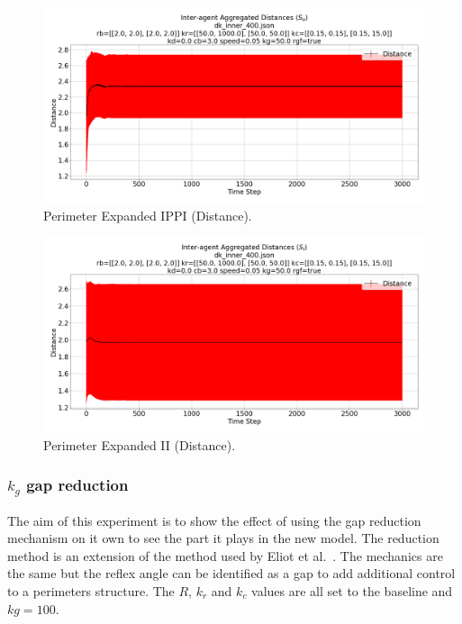 \documentclass[12pt,a4paper]{IEEEtran}
\newcommand{\kc}{\mathit{k_{c}}}
\newcommand{\kr}{\mathit{k_{r}}}
\newcommand{\kg}{\mathit{k_{g}}}
\newcommand{\rb}{\mathit{R}}
\begin{document}
\begin{figure}[H]
	\begin{center}
		\includegraphics[width=1.0\linewidth]{figures/innerDistanceIPPI}
	\end{center}
	\caption{Perimeter Expanded IPPI (Distance). \label{fig:perimExpandDistanceIPPI}}
\end{figure}

\begin{figure}[H]
	\begin{center}
		\includegraphics[width=1.0\linewidth]{figures/innerDistanceII}
	\end{center}
	\caption{Perimeter Expanded II (Distance). \label{fig:perimExpandDistanceII}}
\end{figure}

\subsubsection{$\kg$ gap reduction}

The aim of this experiment is to show the effect of using the gap reduction mechanism on it own to see the part it plays in the new model. The reduction method is an extension of the method used by Eliot et al.~\cite{eliot2018metric}. The mechanics are the same but the reflex angle can be identified as a gap to add additional control to a perimeters structure. The $\rb$, $\kr$ and $\kc$ values are all set to the baseline and $kg=100$.
\end{document}
